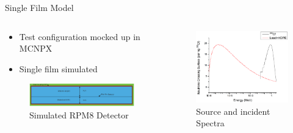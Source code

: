 \begin{frame}{Single Film Model}
\begin{columns}[onlytextwidth]
\begin{column}{0.45\textwidth}
\begin{itemize}
	\item Test configuration mocked up in MCNPX
	\item Single film simulated
\end{itemize}
	\tiny
	\begin{figure}
		\centering
		\includegraphics[width=\textwidth]{images/SingleFilm_DetectorAssembly.eps}
		\caption{Simulated RPM8 Detector}
	\end{figure}
\end{column}
\begin{column}{0.45\textwidth}
	\tiny
	\begin{figure}
		\centering
		\includegraphics[width=\textwidth]{images/WattFission.eps}
		\caption{Source and incident Spectra}
	\end{figure}
\end{column}
\end{columns}
\end{frame}
